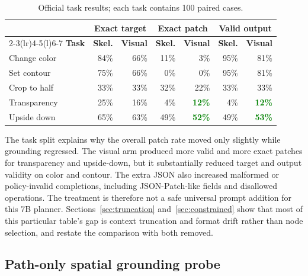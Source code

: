 \documentclass[10pt,a4paper]{article}
\newcommand{\good}[1]{\textcolor{green}{\textbf{#1}}}
\begin{document}
\begin{table}[H]
\centering
\caption{Official task results; each task contains 100 paired cases.}
\begin{tabular}{@{}lrrrrrr@{}}
\toprule
& \multicolumn{2}{c}{\textbf{Exact target}} &
\multicolumn{2}{c}{\textbf{Exact patch}} &
\multicolumn{2}{c}{\textbf{Valid output}}\\
\cmidrule(lr){2-3}\cmidrule(lr){4-5}\cmidrule(l){6-7}
\textbf{Task} & \textbf{Skel.} & \textbf{Visual} &
\textbf{Skel.} & \textbf{Visual} & \textbf{Skel.} & \textbf{Visual}\\
\midrule
Change color & 84\% & 66\% & 11\% & 3\% & 95\% & 81\%\\
Set contour & 75\% & 66\% & 0\% & 0\% & 95\% & 81\%\\
Crop to half & 33\% & 33\% & 32\% & 22\% & 33\% & 33\%\\
Transparency & 25\% & 16\% & 4\% & \good{12\%} & 4\% & \good{12\%}\\
Upside down & 65\% & 63\% & 49\% & \good{52\%} & 49\% & \good{53\%}\\
\bottomrule
\end{tabular}
\end{table}

The task split explains why the overall patch rate moved only slightly while
grounding regressed. The visual arm produced more valid and more exact patches
for transparency and upside-down, but it substantially reduced target and
output validity on color and contour. The extra JSON also increased malformed
or policy-invalid completions, including JSON-Patch-like fields and disallowed
operations. The treatment is therefore not a safe universal prompt addition
for this 7B planner. Sections~\ref{sec:truncation}
and~\ref{sec:constrained} show that most of this particular table's gap is
context truncation and format drift rather than node selection, and restate
the comparison with both removed.

\subsection{Path-only spatial grounding probe}
\end{document}
